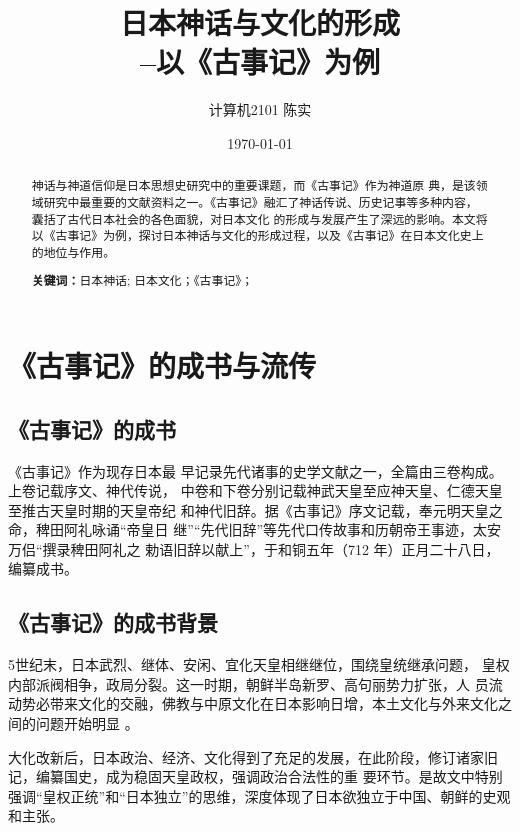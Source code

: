 \documentclass{ctexart}
\title{\textbf{日本神话与文化的形成}\\{\small --以《古事记》为例}}
\author{计算机2101 陈实}
\date{\today}
\begin{document}
\setlength{\baselineskip}{20pt}
\maketitle

\setcounter{page}{0}
\maketitle
\thispagestyle{empty}

\begin{abstract}
    \setlength{\baselineskip}{20pt}
    神话与神道信仰是日本思想史研究中的重要课题，而《古事记》作为神道原
典，是该领域研究中最重要的文献资料之一。《古事记》融汇了神话传说、历史记事等多种内容，囊括了古代日本社会的各色面貌，对日本文化
的形成与发展产生了深远的影响。本文将以《古事记》为例，探讨日本神话与文化的形成过程，以及《古事记》在日本文化史上的地位与作用。
    \par\textbf{关键词：}日本神话; 日本文化；《古事记》； 
\end{abstract}

\newpage
{}
\setcounter{page}{1}
\tableofcontents
\newpage
\setcounter{page}{1}

\section{《古事记》的成书与流传}

\subsection{《古事记》的成书}

《古事记》作为现存日本最
早记录先代诸事的史学文献之一，全篇由三卷构成。上卷记载序文、神代传说，
中卷和下卷分别记载神武天皇至应神天皇、仁德天皇至推古天皇时期的天皇帝纪
和神代旧辞。据《古事记》序文记载，奉元明天皇之命，稗田阿礼咏诵“帝皇日
继”“先代旧辞”等先代口传故事和历朝帝王事迹，太安万侣“撰录稗田阿礼之
勅语旧辞以献上”，于和铜五年（712 年）正月二十八日，编纂成书。

\subsection{《古事记》的成书背景}

5世纪末，日本武烈、继体、安闲、宜化天皇相继继位，围绕皇统继承问题，
皇权内部派阀相争，政局分裂。这一时期，朝鲜半岛新罗、高句丽势力扩张，人
员流动势必带来文化的交融，佛教与中原文化在日本影响日增，本土文化与外来文化之间的问题开始明显
。\par
大化改新后，日本政治、经济、文化得到了充足的发展，在此阶段，修订诸家旧记，编纂国史，成为稳固天皇政权，强调政治合法性的重
要环节。是故文中特别强调“皇权正统”和“日本独立”的思维，深度体现了日本欲独立于中国、朝鲜的史观和主张。
\end{document}
